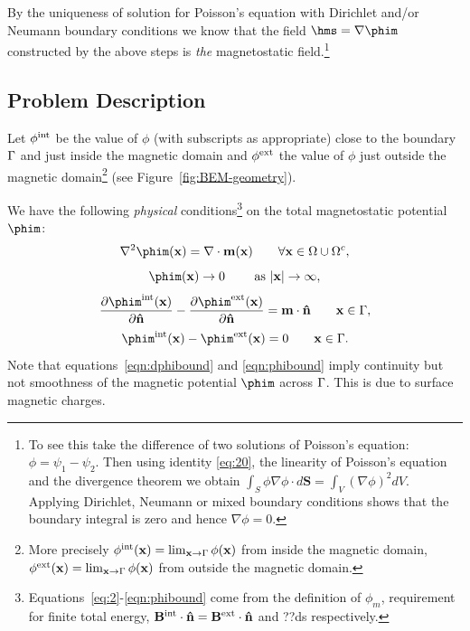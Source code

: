 By the uniqueness of solution for Poisson's equation with Dirichlet and/or Neumann boundary conditions we know that the field $ \hms = \nabla \phim$  constructed by the above steps is \emph{the} magnetostatic field.\footnote{To see this take the difference of two solutions of Poisson's equation: $\phi = \psi_1 - \psi_2$. Then using identity \eqref{eq:20}, the linearity of Poisson's equation and the divergence theorem we obtain $\int_S \phi \nabla \phi \cdot d \mathbf{S} = \int_V (\nabla \phi)^2 dV$. Applying Dirichlet, Neumann or mixed boundary conditions shows that the boundary integral is zero and hence $\nabla \phi = 0$.}

\subsection{Problem Description}
\label{sec:problem-description}
Let $\phi^{\text{int}}$ be the value of $\phi$ (with subscripts as appropriate) close to the boundary ${\Gamma}$ and just inside the magnetic domain  and $\phi^{\text{ext}}$ the value of $\phi$ just outside the magnetic domain\footnote{More precisely $\phi^{\text{int}}(\mathbf{x}) = \lim_{\mathbf{x} \rightarrow {\Gamma}} \phi(\mathbf{x})$ from inside the magnetic domain, $\phi^{\text{ext}}(\mathbf{x}) = \lim_{\mathbf{x} \rightarrow {\Gamma}} \phi(\mathbf{x})$ from outside the magnetic domain.} (see Figure~\ref{fig:BEM-geometry}).

\pagebreak %

We have the following \emph{physical} conditions\footnote{Equations~\eqref{eq:2}-\eqref{eqn:phibound} come from the definition of $\phi_m$, requirement for finite total energy, $\mathbf{B}^\text{int} \cdot \mathbf{\hat{n}} = \mathbf{B}^\text{ext} \cdot \mathbf{\hat{n}}$ and ??ds respectively.} on the total magnetostatic potential $\phim$:
\begin{equation}
  \lap \phim(\xv) = \nabla \cdot \mv(\xv) \qquad \forall \xv \in \magd \cup \extd,
  \label{eq:2}
\end{equation}
\begin{equation}
  \phim(\xv) \rightarrow 0 \qquad \text{ as } \abs{\xv} \rightarrow \infty,
\end{equation}
\begin{equation}
  \pd{\phim^\inte(\xv)}{\nv} - \pd{\phim^\exte(\xv)}{\nv} = \mv \cdot \nv \qquad \xv \in \boundd,
  \label{eqn:dphibound}
\end{equation}
\begin{equation}
  \phim^\inte(\xv) - \phim^\exte(\xv)  = 0 \qquad \xv \in \boundd.
  \label{eqn:phibound}
\end{equation}
Note that equations~\eqref{eqn:dphibound} and \eqref{eqn:phibound} imply continuity but not smoothness of the magnetic potential $\phim$ across ${\Gamma}$. This is due to surface magnetic charges.

